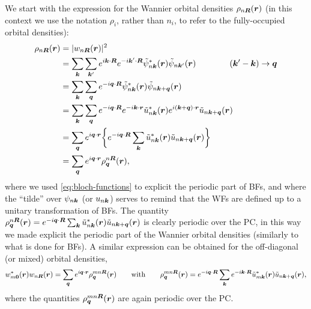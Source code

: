 We start with the expression for the Wannier orbital densities $\rho_{n{\bm R}}({\bm r})$ (in this context we use the notation $\rho_i$, rather than $n_i$, to refer to the fully-occupied orbital densities):
%
\begin{equation}
    \begin{split}
        \rho_{n{\bm R}}({\bm r}) &= |w_{n{\bm R}}({\bm r})|^2 \\
        &= \sum_{{\bm k}} \sum_{{\bm k}'} e^{i {\bm k} \cdot {\bm R}} e^{-i {\bm k}' \cdot {\bm R}} \tilde{\psi}^*_{n {\bm k}}({\bm r}) \tilde{\psi}_{n {\bm k}'}({\bm r}) \qquad \qquad ({\bm k}' - {\bm k}) \rightarrow {\bm q} \\
        & = \sum_{{\bm k}} \sum_{{\bm q}} e^{-i {\bm q} \cdot {\bm R}} \tilde{\psi}^*_{n {\bm k}}({\bm r}) \tilde{\psi}_{n {\bm k}+{\bm q}}({\bm r}) \\
        & = \sum_{{\bm k}} \sum_{{\bm q}} e^{-i {\bm q} \cdot {\bm R}} e^{-i {\bm k} \cdot {\bm r}} \tilde{u}^*_{n {\bm k}}({\bm r}) e^{i ({\bm k}+{\bm q}) \cdot {\bm r}}\tilde{u}_{n {\bm k}+{\bm q}}({\bm r}) \\
        & = \sum_{{\bm q}} e^{i {\bm q} \cdot {\bm r}} \bigg\{ e^{-i {\bm q} \cdot {\bm R}} \sum_{{\bm k}} \tilde{u}^*_{n {\bm k}}({\bm r})\tilde{u}_{n {\bm k}+{\bm q}}({\bm r}) \bigg\} \\
        & = \sum_{{\bm q}} e^{i {\bm q} \cdot {\bm r}} \rho_{{\bm q}}^{n {\bm R}}({\bm r}) ,
    \end{split}
    \label{eq:wannier-densities-kcw}
\end{equation}
%
where we used \cref{eq:bloch-functions} to explicit the periodic part of BFs, and where the ``tilde'' over $\psi_{n{\bm k}}$ (or $u_{n {\bm k}}$) serves to remind that the WFs are defined up to a unitary transformation of BFs. The quantity $\rho_{{\bm q}}^{n {\bm R}}({\bm r}) = e^{-i {\bm q} \cdot {\bm R}} \sum_{{\bm k}} \tilde{u}^*_{n {\bm k}}({\bm r})\tilde{u}_{n {\bm k}+{\bm q}}({\bm r})$ is clearly periodic over the PC, in this way we made explicit the periodic part of the Wannier orbital densities (similarly to what is done for BFs). A similar expression can be obtained for the off-diagonal (or mixed) orbital densities,
%
\begin{equation}
    w_{m{\bm 0}}^*({\bm r}) w_{n{\bm R}}({\bm r}) = \sum_{{\bm q}} e^{i {\bm q} \cdot {\bm r}} \rho_{{\bm q}}^{mn {\bm R}}({\bm r})
    \qquad {\rm with} \qquad
    \rho_{{\bm q}}^{mn {\bm R}}({\bm r}) = e^{-i {\bm q} \cdot {\bm R}} \sum_{{\bm k}} e^{-i {\bm k} \cdot {\bm R}} \tilde{u}^*_{m {\bm k}}({\bm r})\tilde{u}_{n {\bm k}+{\bm q}}({\bm r}) ,
    \label{eq:mixed-wannier-densities-kcw}
\end{equation}
%
where the quantities $\rho_{{\bm q}}^{mn {\bm R}}({\bm r})$ are again periodic over the PC.

